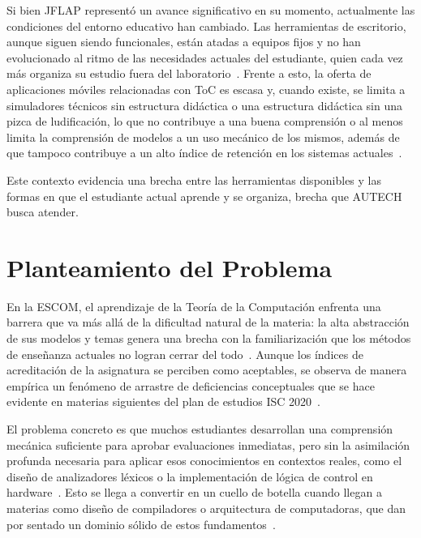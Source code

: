 Si bien JFLAP representó un avance significativo en su momento, actualmente las condiciones
del entorno educativo han cambiado. Las herramientas de escritorio, aunque siguen siendo
funcionales, están atadas a equipos fijos y no han evolucionado al ritmo de las necesidades
actuales del estudiante, quien cada vez más organiza su estudio fuera del
laboratorio~\cite{nielsen1994}. Frente a esto, la oferta de aplicaciones móviles relacionadas
con ToC es escasa y, cuando existe, se limita a simuladores técnicos sin estructura didáctica
o una estructura didáctica sin una pizca de ludificación, lo que no contribuye a una buena
comprensión o al menos limita la comprensión de modelos a un uso mecánico de los mismos,
además de que tampoco contribuye a un alto índice de retención en los sistemas
actuales~\cite{felder2016, crompton2018}.

Este contexto evidencia una brecha entre las herramientas disponibles y las formas en que el
estudiante actual aprende y se organiza, brecha que AUTECH busca atender.

\section{Planteamiento del Problema}
\label{sec:planteamiento}

En la ESCOM, el aprendizaje de la Teoría de la Computación enfrenta una barrera que va más
allá de la dificultad natural de la materia: la alta abstracción de sus modelos y temas genera
una brecha con la familiarización que los métodos de enseñanza actuales no logran cerrar del
todo~\cite{hopcroft2007}. Aunque los índices de acreditación de la asignatura se perciben como
aceptables, se observa de manera empírica un fenómeno de arrastre de deficiencias conceptuales
que se hace evidente en materias siguientes del plan de estudios ISC
2020~\cite{ipn2020, felder2016}.

El problema concreto es que muchos estudiantes desarrollan una comprensión mecánica suficiente
para aprobar evaluaciones inmediatas, pero sin la asimilación profunda necesaria para aplicar
esos conocimientos en contextos reales, como el diseño de analizadores léxicos o la
implementación de lógica de control en hardware~\cite{aho2006}. Esto se llega a convertir en
un cuello de botella cuando llegan a materias como diseño de compiladores o arquitectura de
computadoras, que dan por sentado un dominio sólido de estos fundamentos~\cite{munoz2012}.


